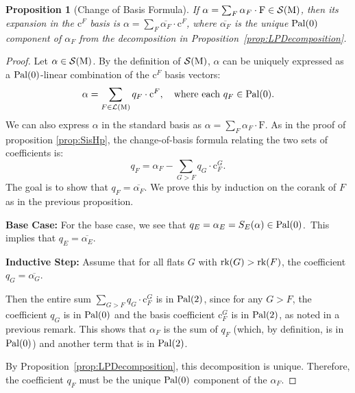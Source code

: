 \documentclass[11pt]{article}
\newcommand{\calL}{\mathcal{L}}
\newcommand{\calS}{\mathcal{S}}
\newcommand{\rank}{\normalfont\text{rk}}
\newcommand{\M}{\normalfont\text{M}}
\newcommand{\Ebasis}[1]{\mathrm{#1}}
\newcommand{\Cbasis}[1]{\mathrm{c}^{#1}}
\newcommand{\CbasisSub}[2]{\mathrm{c}^{#1}_{#2}}
\newcommand{\pal}{\normalfont\text{Pal}}
\newtheorem{proposition}[theorem]{Proposition}
\theoremstyle{remark}
\begin{document}
\begin{proposition}[Change of Basis Formula]\label{prop:changeofbasis}
    If \(\alpha = \sum_F \alpha_F \cdot\Ebasis{F} \in \calS(\M)\),
    then its expansion in the \(\Cbasis{F}\) basis is
    \(\alpha = \sum_F \overline{\alpha_F} \cdot\Cbasis{F}\), where \(\overline{\alpha_F}\) is the unique \(\pal(0)\) component of \(\alpha_F\) from the decomposition in Proposition~\ref{prop:LPDecomposition}.
\end{proposition}
\begin{proof}
    Let \(\alpha \in \calS(\M)\). By the definition of \(\calS(\M)\), \(\alpha\) can be uniquely expressed as a \(\pal(0)\)-linear combination of the \(\Cbasis{F}\) basis vectors:
    \[ \alpha = \sum_{F \in \calL(\M)} q_F \cdot \Cbasis{F}, \quad \text{where each } q_F \in \pal(0). \]
    We can also express \(\alpha\) in the standard basis as \(\alpha = \sum_F \alpha_F \cdot\Ebasis{F}\).
    As in the proof of proposition \ref{prop:SisHp}, the change-of-basis formula relating the two sets of coefficients is:
    \begin{equation}\label{eq:changeofbasis}
        q_F = \alpha_F - \sum_{G > F} q_G \cdot \CbasisSub{G}{F}.
    \end{equation}
    The goal is to show that \(q_F = \overline{\alpha_F}\). We
    prove this by induction on the corank of \(F\) as in the previous proposition.

    \textbf{Base Case:} For the base case, we see that \(q_E = \alpha_E = S_E(\alpha) \in \pal(0)\).\
    This implies that \(q_E = \overline{\alpha_E}\).

    \textbf{Inductive Step:} Assume that for all flats \(G\) with \(\rank(G) > \rank(F)\),
    the coefficient \(q_G = \overline{\alpha_G}\).

    Then the entire sum \(\sum_{G > F} q_G \cdot \CbasisSub{G}{F}\) is in \(\pal(2)\), since for any \(G > F\),
    the coefficient \(q_G\) is in \(\pal(0)\) and the basis coefficient \(\CbasisSub{G}{F}\) is in
    \(\pal(2)\), as noted in a previous remark.
    This shows that \(\alpha_F\) is the sum of \(q_F\) (which, by definition, is in \(\pal(0)\))
    and another term that is in \(\pal(2)\).

    By Proposition~\ref{prop:LPDecomposition}, this decomposition is unique. Therefore,
    the coefficient \(q_F\) must be the unique \(\pal(0)\) component of the \(\alpha_F\).
\end{proof}
\end{document}
